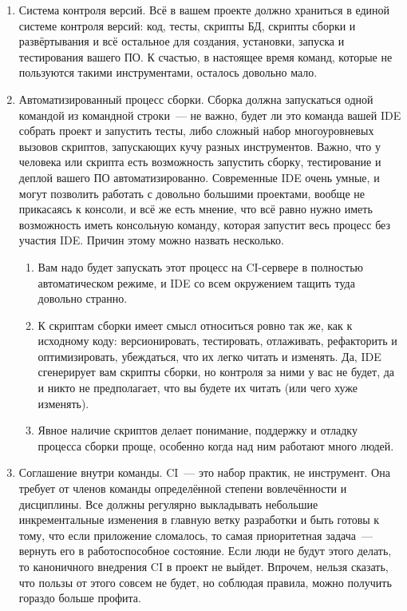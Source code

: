 \documentclass{../../text-style}
\begin{document}
\begin{enumerate}
    \item Система контроля версий. Всё в вашем проекте должно храниться в единой системе контроля версий: код, тесты, скрипты БД, скрипты сборки и развёртывания и всё остальное для создания, установки, запуска и тестирования вашего ПО. К счастью, в настоящее время команд, которые не пользуются такими инструментами, осталось довольно мало.
    \item Автоматизированный процесс сборки. Сборка должна запускаться одной командой из командной строки~--- не важно, будет ли это команда вашей IDE собрать проект и запустить тесты, либо сложный набор многоуровневых вызовов скриптов, запускающих кучу разных инструментов. Важно, что у человека или скрипта есть возможность запустить сборку, тестирование и деплой вашего ПО автоматизированно. Современные IDE очень умные, и могут позволить работать с довольно большими проектами, вообще не прикасаясь к консоли, и всё же есть мнение, что всё равно нужно иметь возможность иметь консольную команду, которая запустит весь процесс без участия IDE. Причин этому можно назвать несколько.
    \begin{enumerate}
        \item Вам надо будет запускать этот процесс на CI-сервере в полностью автоматическом режиме, и IDE со всем окружением тащить туда довольно странно.
        \item К скриптам сборки имеет смысл относиться ровно так же, как к исходному коду: версионировать, тестировать, отлаживать, рефакторить и оптимизировать, убеждаться, что их легко читать и изменять. Да, IDE сгенерирует вам скрипты сборки, но контроля за ними у вас не будет, да и никто не предполагает, что вы будете их читать (или чего хуже изменять).
        \item Явное наличие скриптов делает понимание, поддержку и отладку процесса сборки проще, особенно когда над ним работают много людей.
    \end{enumerate}
    \item Соглашение внутри команды. CI~--- это набор практик, не инструмент. Она требует от членов команды определённой степени вовлечённости и дисциплины. Все должны регулярно выкладывать небольшие инкрементальные изменения в главную ветку разработки и быть готовы к тому, что если приложение сломалось, то самая приоритетная задача~--- вернуть его в работоспособное состояние. Если люди не будут этого делать, то каноничного внедрения CI в проект не выйдет. Впрочем, нельзя сказать, что пользы от этого совсем не будет, но соблюдая правила, можно получить гораздо больше профита.
\end{enumerate}
\end{document}
